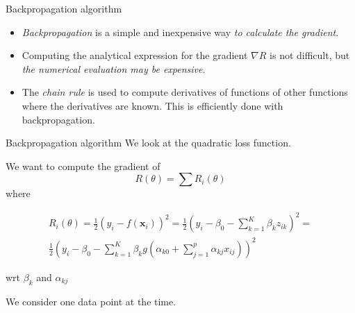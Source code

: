 \documentclass[
  10pt,
  ignorenonframetext,
  twocolumn]{beamer}
\providecommand{\tightlist}{%
  \setlength{\itemsep}{0pt}\setlength{\parskip}{0pt}}
\begin{document}
\begin{frame}
\begin{block}{Backpropagation algorithm}
\label{backpropagation-algorithm}
\(~\)

\begin{itemize}
\tightlist
\item
  \emph{Backpropagation} is a simple and inexpensive way \emph{to
  calculate the gradient}.
\end{itemize}

\vspace{2mm}

\begin{itemize}
\tightlist
\item
  Computing the analytical expression for the gradient \(\nabla R\) is
  not difficult, but \emph{the numerical evaluation may be expensive}.
\end{itemize}

\vspace{2mm}

\vspace{2mm}

\begin{itemize}
\tightlist
\item
  The \emph{chain rule} is used to compute derivatives of functions of
  other functions where the derivatives are known. This is efficiently
  done with backpropagation.
\end{itemize}
\end{block}
\end{frame}

\begin{frame}
\begin{block}{Backpropagation algorithm}
\label{backpropagation-algorithm-1}
We look at the quadratic loss function.

We want to compute the gradient of \[
R(\theta) = \sum R_i(\theta) 
\] where

\[
\begin{aligned}
R_i(\theta) = \frac{1}{2}\left(y_i - f(\mathbf{x}_i)\right)^2 = \frac{1}{2}\left(y_i - \beta_{0} - \sum_{k = 1}^K \beta_{k} z_{ik}\right)^2 = \\
\frac{1}{2}\left(y_i - \beta_{0} - \sum_{k = 1}^K \beta_{k} g(\alpha_{k0} + \sum_{j = 1}^p\alpha_{kj}x_{ij})\right)^2
\end{aligned}
\]

wrt \(\beta_{k}\) and \(\alpha_{kj}\)

We consider one data point at the time.
\end{block}
\end{frame}
\end{document}
